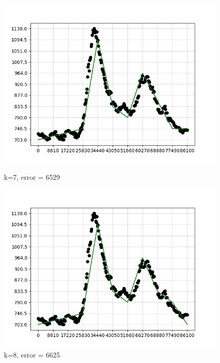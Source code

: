 \documentclass{article}
\begin{document}
    \begin{figure}[h!]
          \centering
          \begin{minipage}{.3\textwidth}
            \centering
            \includegraphics[width=.9\linewidth]{graficos/solution_11x11,7N_optimistic_instance.png}
            \caption{k=7, error = 6529}
          \end{minipage}%
          \begin{minipage}{.3\textwidth}
            \centering
            \includegraphics[width=.9\linewidth]{graficos/solution_11x11,8N_optimistic_instance.png}
            \caption{k=8, error = 6625}
          \end{minipage}%
          \begin{minipage}{.3\textwidth}
            \centering

\end{minipage}
\end{figure}
\end{document}
